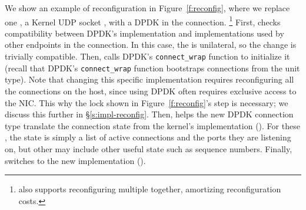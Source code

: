 We show an example of reconfiguration in Figure~\ref{f:reconfig}, where we replace one \tunnel, a Kernel UDP socket \tunnel, with a DPDK \tunnel in the connection.
\footnote{\name also supports reconfiguring multiple \tunnels together, amortizing reconfiguration costs.}
First, \name checks compatibility between DPDK's implementation and implementations used by other endpoints in the connection. In this case, the \tunnel is unilateral, so the change is trivially compatible.
Then, \name calls DPDK's \texttt{connect\_wrap} function to initialize it (recall that DPDK's \texttt{connect\_wrap} function bootstraps connections from the unit type). Note that changing this specific \tunnel implementation requires reconfiguring all the connections on the host, since using DPDK often requires exclusive access to the NIC.
This why the lock shown in Figure~\ref{f:reconfig}'s step  is necessary; we discuss this further in \S\ref{s:impl-reconfig}. 
Then, \name helps the new DPDK connection type translate the connection state from the kernel's \tunnel implementation ().
For these \tunnels, the state is simply a list of active connections and the ports they are listening on, but other \tunnels may include other useful state such as sequence numbers.
Finally, \name switches to the new implementation ().
  
